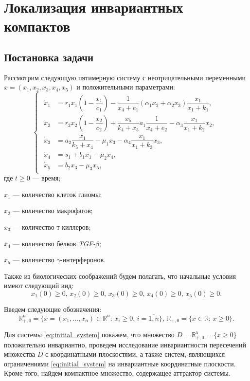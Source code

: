 \documentclass[14pt,a4paper]{extarticle}
\begin{document}
	\section{Локализация инвариантных компактов}
	\subsection{Постановка задачи}
	
	Рассмотрим следующую пятимерную систему с неотрицательными переменными $x=(x_1, x_2, x_3, x_4, x_5)$ и положительными параметрами:
	\begin{equation}
		\begin{cases}
			\begin{aligned}
				\dot{x}_1 &= r_1x_1\left(1-\dfrac{x_1}{c_1}\right)-\dfrac{1}{x_4+e_1}(\alpha_1x_2+\alpha_2x_3)\dfrac{x_1}{x_1+k_1},\\
				\dot{x}_2 &= r_2x_2\left(1-\dfrac{x_2}{c_2}\right)+\dfrac{x_5}{k_4+x_5}a_1\dfrac{1}{x_4+e_2}-\alpha_3\dfrac{x_1}{x_1+k_2}x_2,\\
				\dot{x}_3 &= a_2\dfrac{x_1}{k_5+x_4}-\mu_1x_3-\alpha_4\dfrac{x_1}{x_1+k_3}x_3,\\
				\dot{x}_4 &= s_1 + b_1x_1-\mu_2x_4,\\
				\dot{x}_5 &= b_2x_3-\mu_3x_5,
			\end{aligned}
		\end{cases}\label{eq:initial_system}
	\end{equation}
	где $t\ge0$ --- время;
	
	$x_1$ --- количество клеток глиомы; 
	
	$x_2$ --- количество макрофагов;
	
	$x_3$ --- количество т-киллеров;
	
	$x_4$ --- количество белков \textit{TGF-}$\beta$;
	
	$x_5$ --- количество $\gamma$-интерферонов. 
	
	Также из биологических соображений будем полагать, что начальные условия имеют следующий вид:
	\begin{equation}\label{eq:conds}
	x_1(0)\ge0,\,x_2(0)\ge0,\,x_3(0)\ge0,\,x_4(0)\ge0,\,x_5(0)\ge0.
	\end{equation}
	
	Введем следующие обозначения:
	\[\mathbb{R}^n_{+,0}=\{x=(x_1,\ldots,x_n)\in\mathbb{R}^n:\, x_i\ge0,\, i=\overline{1,n}\},\,\mathbb{R}_{+,0}=\{x\in\mathbb{R}:\, x\ge0\}.\]
	
	Для системы \ref{eq:initial_system} покажем, что множество $D=\mathbb{R}^{5}_{+,0} = \{x \ge 0\}$ положительно инвариантно, проведем исследование инвариантности пересечений множества $D$ с координатными плоскостями, а также систем, являющихся ограничениями \ref{eq:initial_system} на инвариантные координатные плоскости. Кроме того, найдем компактное множество, содержащее аттрактор системы.
	
\end{document}
